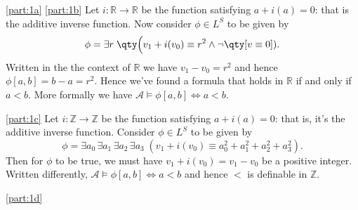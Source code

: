 \documentclass[boxes,pages,color=CornflowerBlue]{homework}
\newcommand{\Z}{\mathbb{Z}}
\newcommand{\R}{\mathbb{R}}
\begin{document}
\begin{solution}
    \ref{part:1a}
    \ref{part:1b}
    Let $i: \R \to \R$ be the function satisfying $a + i(a) = 0$: that is the additive inverse function.
    Now consider $\phi\in L^S$ to be given by
    \begin{equation*}
        \phi = \exists r \; \qty\Big(v_1 + i(v_0) \equiv r^2 \wedge \neg \qty[v \equiv 0]).
    \end{equation*}
    Written in the the context of $\R$ we have $v_1 - v_0 = r^2$ and hence $\phi[a, b] = b - a = r^2$.
    Hence we've found a formula that holds in $\R$ if and only if $a<b$.
    More formally we have $\mathcal{A}\vDash \phi[a, b] \iff a < b$.

    \ref{part:1c}
    Let $i: \Z \to \Z$ be the function satisfying $a + i(a) = 0$: that is, it's the additive inverse function.
    Consider $\phi\in L^S$ to be given by
    \begin{equation*}
        \phi = \exists a_0 \, \exists a_1 \, \exists a_2 \, \exists a_3 \; (v_1 + i(v_0) \equiv a_0^2 + a_1^2 + a_2^2 + a_3^2).
    \end{equation*}
    Then for $\phi$ to be true, we must have $v_1 + i(v_0) = v_1 - v_0$ be a positive integer.
    Written differently, $\mathcal{A}\vDash \phi[a,b] \iff a < b$ and hence $<$ is definable in $\Z$.

    \ref{part:1d}
\end{solution}
\end{document}
